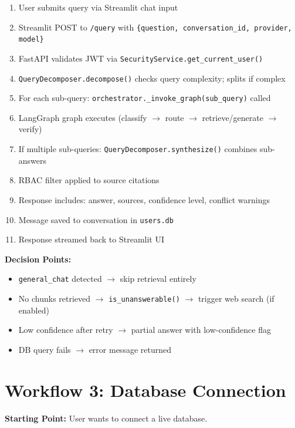 \documentclass[12pt, a4paper, oneside]{report}
\newcommand{\kw}[1]{\texttt{\small #1}}
\begin{document}
\begin{enumerate}
  \item User submits query via Streamlit chat input
  \item Streamlit POST to \kw{/query} with \kw{\{question, conversation\_id, provider, model\}}
  \item FastAPI validates JWT via \kw{SecurityService.get\_current\_user()}
  \item \kw{QueryDecomposer.decompose()} checks query complexity; splits if complex
  \item For each sub-query: \kw{orchestrator.\_invoke\_graph(sub\_query)} called
  \item LangGraph graph executes (classify $\to$ route $\to$ retrieve/generate $\to$ verify)
  \item If multiple sub-queries: \kw{QueryDecomposer.synthesize()} combines sub-answers
  \item RBAC filter applied to source citations
  \item Response includes: answer, sources, confidence level, conflict warnings
  \item Message saved to conversation in \kw{users.db}
  \item Response streamed back to Streamlit UI
\end{enumerate}

\textbf{Decision Points:}
\begin{itemize}
  \item \kw{general\_chat} detected $\to$ skip retrieval entirely
  \item No chunks retrieved $\to$ \kw{is\_unanswerable()} $\to$ trigger web search (if enabled)
  \item Low confidence after retry $\to$ partial answer with low-confidence flag
  \item DB query fails $\to$ error message returned
\end{itemize}

\section{Workflow 3: Database Connection}

\textbf{Starting Point:} User wants to connect a live database.
\end{document}
